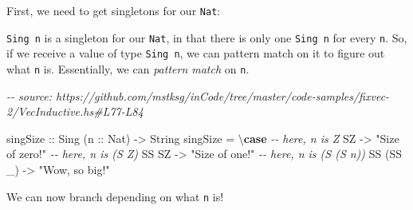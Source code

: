 \documentclass[]{article}
\newenvironment{Shaded}{}{}
\newcommand{\CommentTok}[1]{\textcolor[rgb]{0.38,0.63,0.69}{\textit{#1}}}
\newcommand{\DataTypeTok}[1]{\textcolor[rgb]{0.56,0.13,0.00}{#1}}
\newcommand{\KeywordTok}[1]{\textcolor[rgb]{0.00,0.44,0.13}{\textbf{#1}}}
\newcommand{\NormalTok}[1]{#1}
\newcommand{\OperatorTok}[1]{\textcolor[rgb]{0.40,0.40,0.40}{#1}}
\newcommand{\OtherTok}[1]{\textcolor[rgb]{0.00,0.44,0.13}{#1}}
\newcommand{\StringTok}[1]{\textcolor[rgb]{0.25,0.44,0.63}{#1}}
\begin{document}
First, we need to get singletons for our \texttt{Nat}:

\begin{Shaded}
\end{Shaded}

\texttt{Sing\ n} is a singleton for our \texttt{Nat}, in that there is only one
\texttt{Sing\ n} for every \texttt{n}. So, if we receive a value of type
\texttt{Sing\ n}, we can pattern match on it to figure out what \texttt{n} is.
Essentially, we can \emph{pattern match} on \texttt{n}.

\begin{Shaded}
\begin{Highlighting}[]
\CommentTok{{-}{-} source: https://github.com/mstksg/inCode/tree/master/code{-}samples/fixvec{-}2/VecInductive.hs\#L77{-}L84}

\OtherTok{singSize ::} \DataTypeTok{Sing}\NormalTok{ (}\OtherTok{n ::} \DataTypeTok{Nat}\NormalTok{) }\OtherTok{{-}>} \DataTypeTok{String}
\NormalTok{singSize }\OtherTok{=}\NormalTok{ \textbackslash{}}\KeywordTok{case}
    \CommentTok{{-}{-} here, n is \textquotesingle{}Z}
    \DataTypeTok{SZ}        \OtherTok{{-}>} \StringTok{"Size of zero!"}
    \CommentTok{{-}{-} here, n is (\textquotesingle{}S \textquotesingle{}Z)}
    \DataTypeTok{SS} \DataTypeTok{SZ}     \OtherTok{{-}>} \StringTok{"Size of one!"}
    \CommentTok{{-}{-} here, n is (\textquotesingle{}S (\textquotesingle{}S n))}
    \DataTypeTok{SS}\NormalTok{ (}\DataTypeTok{SS}\NormalTok{ \_) }\OtherTok{{-}>} \StringTok{"Wow, so big!"}
\end{Highlighting}
\end{Shaded}

We can now branch depending on what \texttt{n} is!
\end{document}
